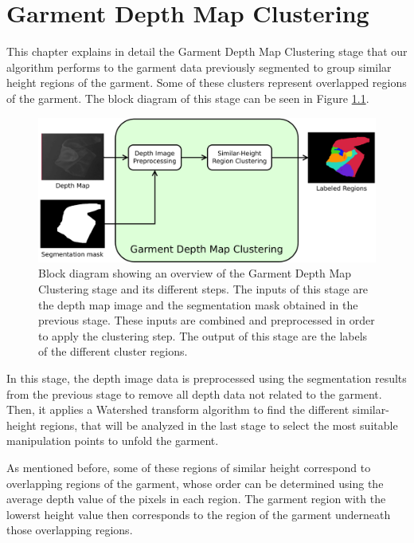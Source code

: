 \chapter{Garment Depth Map Clustering}
\label{garment_clustering}

This chapter explains in detail the Garment Depth Map Clustering stage that our algorithm performs to the garment data previously segmented to group similar height regions of the garment. Some of these clusters represent overlapped regions of the garment. The block diagram of this stage can be seen in Figure \ref{fig:garment_clustering_blocks}.

\begin{figure}[thpb]
    \centering
    \includegraphics[width=\textwidth]
    {figures/Garment-depthmap-diagram.pdf}
    \caption[Block diagram showing an overview of the Garment Depth Map Clustering stage and its different steps.]
    {Block diagram showing an overview of the Garment Depth Map Clustering stage and its different steps. The inputs of this stage are the depth map image and the segmentation mask obtained in the previous stage. These inputs are combined and preprocessed in order to apply the clustering step. The output of this stage are the labels of the different cluster regions.}
    \label{fig:garment_clustering_blocks}
\end{figure}

In this stage, the depth image data is preprocessed using the segmentation results from the previous stage to remove all depth data not related to the garment. Then, it applies a Watershed transform algorithm to find the different similar-height regions, that will be analyzed in the last stage to select the most suitable manipulation points to unfold the garment. 

As mentioned before, some of these regions of similar height correspond to overlappìng regions of the garment, whose order can be determined using the average depth value of the pixels in each region. The garment region with the lowerst height value then corresponds to the region of the garment underneath those overlapping regions.

